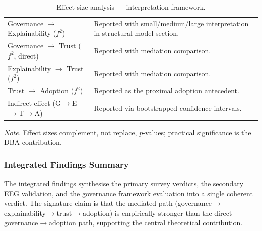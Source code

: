 {\tablestripes\tablefontsize
{}
\begin{xltabular}{\textwidth}{@{} >{\raggedright\arraybackslash}p{5cm} L @{}}
\caption[Effect size analysis --- interpretation framework]{Effect size analysis --- interpretation framework.}\label{tab:ch4_effect_size} \\
\toprule
{} &  \\
\midrule
\endfirsthead
\endhead
\bottomrule
\endlastfoot
Governance $\rightarrow$ Explainability ($f^2$) & Reported with small/medium/large interpretation in structural-model section. \\
\addlinespace
Governance $\rightarrow$ Trust ($f^2$, direct) & Reported with mediation comparison. \\
\addlinespace
Explainability $\rightarrow$ Trust ($f^2$) & Reported with mediation comparison. \\
\addlinespace
Trust $\rightarrow$ Adoption ($f^2$) & Reported as the proximal adoption antecedent. \\
\addlinespace
Indirect effect (G$\rightarrow$E$\rightarrow$T$\rightarrow$A) & Reported via bootstrapped confidence intervals. \\
\end{xltabular}}

\vspace{0.3em}\noindent\textit{Note.} Effect sizes complement, not replace, $p$-values; practical significance is the DBA contribution.


\subsubsection{Integrated Findings Summary}
\label{sec:ch4_integrated_findings}

\noindent The integrated findings synthesise the primary survey verdicts, the secondary EEG validation, and the governance framework evaluation into a single coherent verdict. The signature claim is that the mediated path (governance$\rightarrow$explainability$\rightarrow$trust$\rightarrow$adoption) is empirically stronger than the direct governance$\rightarrow$adoption path, supporting the central theoretical contribution.

